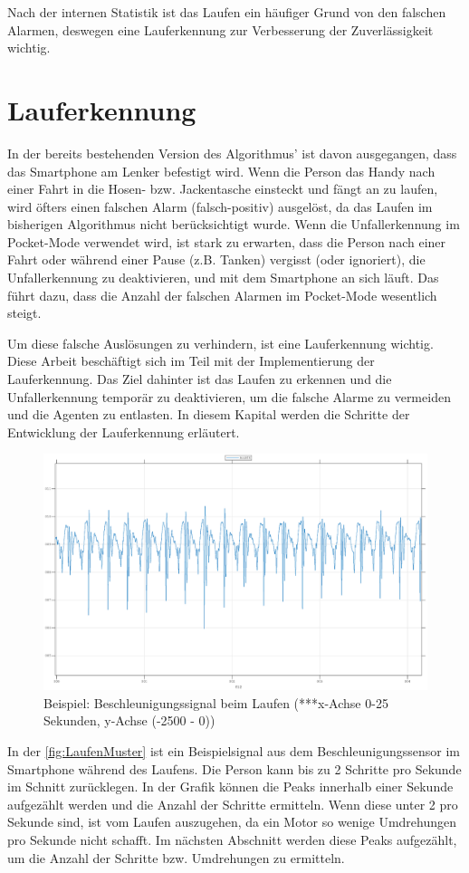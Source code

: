 Nach der internen Statistik ist das Laufen ein häufiger Grund von den falschen Alarmen, deswegen eine Lauferkennung zur Verbesserung der Zuverlässigkeit wichtig.

\section{Lauferkennung} \label{sec:Lauferkennung}
In der bereits bestehenden Version des Algorithmus' ist davon ausgegangen, dass das Smartphone am Lenker befestigt wird. Wenn die Person das Handy nach einer Fahrt in die Hosen- bzw. Jackentasche einsteckt und fängt an zu laufen, wird öfters einen falschen Alarm (falsch-positiv) ausgelöst, da das Laufen im bisherigen Algorithmus nicht berücksichtigt wurde.
Wenn die Unfallerkennung im Pocket-Mode verwendet wird, ist stark zu erwarten, dass die Person nach einer Fahrt oder während einer Pause (z.B. Tanken) vergisst (oder ignoriert), die Unfallerkennung zu deaktivieren, und mit dem Smartphone an sich läuft. Das führt dazu, dass die Anzahl der falschen Alarmen im Pocket-Mode wesentlich steigt.

Um diese falsche Auslösungen zu verhindern, ist eine Lauferkennung wichtig. Diese Arbeit beschäftigt sich im Teil mit der Implementierung der Lauferkennung. Das Ziel dahinter ist das Laufen zu erkennen und die Unfallerkennung temporär zu deaktivieren, um die falsche Alarme zu vermeiden und die Agenten zu entlasten.
In diesem Kapital werden die Schritte der Entwicklung der Lauferkennung erläutert.


\begin{figure}[H]
	\centering
	\includegraphics[width=\linewidth]{Bilder/LaufenMuster.eps}
	\caption{Beispiel: Beschleunigungssignal beim Laufen (***x-Achse 0-25 Sekunden, y-Achse (-2500 - 0))}
	\label{fig:LaufenMuster}
\end{figure}
In der \autoref{fig:LaufenMuster} ist ein Beispielsignal aus dem Beschleunigungssensor im Smartphone während des Laufens. Die Person kann bis zu 2 Schritte pro Sekunde im Schnitt zurücklegen. In der Grafik können die Peaks innerhalb einer Sekunde aufgezählt werden und die Anzahl der Schritte ermitteln. Wenn diese unter 2 pro Sekunde sind, ist vom Laufen auszugehen, da ein Motor so wenige Umdrehungen pro Sekunde nicht schafft. Im nächsten Abschnitt werden diese Peaks aufgezählt, um die Anzahl der Schritte bzw. Umdrehungen zu ermitteln.
%
